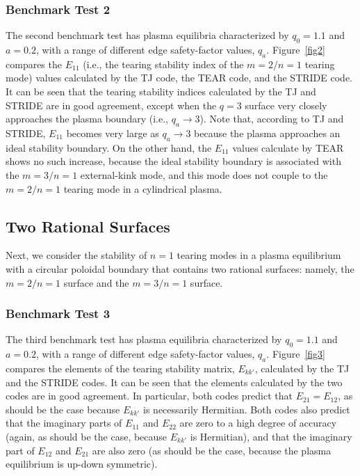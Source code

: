\documentclass[12pt,prb,aps]{revtex4-1}
\begin{document}
\subsubsection{Benchmark Test 2}
The second benchmark test has plasma equilibria characterized by $q_0=1.1$ and $a=0.2$, with a range of different edge safety-factor values, $q_a$. 
Figure~\ref{fig2} compares the $E_{11}$ (i.e.,
the tearing stability index of the $m=2/n=1$ tearing mode) values calculated by the TJ code, the TEAR code, and
the STRIDE code. It can be seen that the tearing stability indices calculated by the TJ and STRIDE are in good agreement, except when the $q=3$ surface very closely approaches the
plasma boundary (i.e., $q_a\rightarrow 3$). 
Note that, according to TJ and STRIDE,  $E_{11}$ becomes very large as $q_a\rightarrow 3$ because the plasma approaches an ideal stability boundary. On the other hand,
the $E_{11}$ values calculate by TEAR shows no such increase, because the ideal stability boundary is associated with the $m=3/n=1$ external-kink mode, and this mode does not couple to the $m=2/n=1$ tearing mode in a cylindrical plasma. 

\subsection{Two Rational Surfaces}
 Next, we consider the stability of $n=1$ tearing modes 
in a  plasma equilibrium with a circular poloidal boundary  that  contains two rational surfaces: namely, the $m=2/n=1$ surface and the $m=3/n=1$ surface. 

\subsubsection{Benchmark Test 3}
The third benchmark test has plasma equilibria characterized by $q_0=1.1$ and $a=0.2$, with a range of different edge safety-factor values, $q_a$. 
Figure~\ref{fig3} compares the elements of the tearing stability matrix, $E_{kk'}$,  calculated by the TJ and the STRIDE codes. It can be seen that the elements calculated by
the two codes are in good agreement. In particular, both codes predict that $E_{21}=E_{12}$, as should be the case because $E_{kk'}$ is necessarily Hermitian.\cite{tj} 
Both codes also predict that the imaginary parts of $E_{11}$ and $E_{22}$ are zero to a high degree of accuracy (again, as should be the case, because $E_{kk'}$ is Hermitian),
and that the imaginary part of $E_{12}$ and $E_{21}$ are also zero (as should be the case, because the plasma equilibrium is up-down symmetric). 
\end{document}
